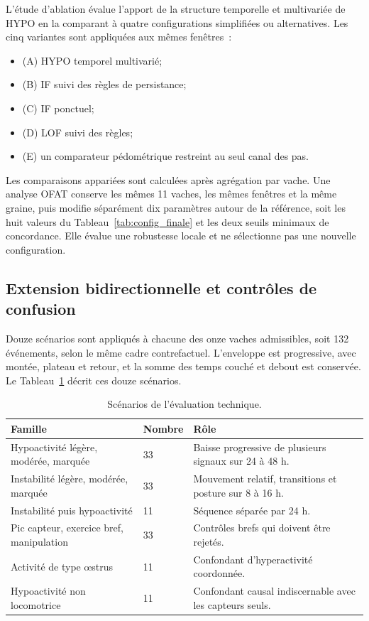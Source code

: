 L'étude d'ablation évalue l'apport de la structure temporelle et multivariée de HYPO en la
comparant à quatre configurations simplifiées ou alternatives. Les cinq variantes sont
appliquées aux mêmes fenêtres~:
\begin{itemize}
  \item (A) HYPO temporel multivarié;
  \item (B) IF suivi des règles de persistance;
  \item (C) IF ponctuel;
  \item (D) LOF suivi des règles;
  \item (E) un comparateur pédométrique restreint au seul canal des pas.
\end{itemize}
Les comparaisons appariées sont calculées après agrégation par vache. Une analyse OFAT
conserve les mêmes 11 vaches, les mêmes fenêtres et la même graine, puis modifie séparément
dix paramètres autour de la référence, soit les huit valeurs du
Tableau~\ref{tab:config_finale} et les deux seuils minimaux de concordance. Elle évalue une robustesse locale et ne sélectionne
pas une nouvelle configuration.

\subsection{Extension bidirectionnelle et contrôles de confusion}
Douze scénarios sont appliqués à chacune des onze vaches admissibles, soit 132 événements,
selon le même cadre contrefactuel. L'enveloppe est progressive, avec montée, plateau et
retour, et la somme des temps couché et debout est conservée. Le
Tableau~\ref{tab:profils_detection} décrit ces douze scénarios.

\begin{table}[H]
  \centering
  \caption{Scénarios de l'évaluation technique.}
  \label{tab:profils_detection}
  \small
  \begin{tabular}{p{}p{}p{}}
    \toprule
    Famille & Nombre & Rôle \\
    \midrule
    Hypoactivité légère, modérée, marquée & 33 & Baisse progressive de plusieurs signaux sur 24 à 48 h. \\
    Instabilité légère, modérée, marquée & 33 & Mouvement relatif, transitions et posture sur 8 à 16 h. \\
    Instabilité puis hypoactivité & 11 & Séquence séparée par 24 h. \\
    Pic capteur, exercice bref, manipulation & 33 & Contrôles brefs qui doivent être rejetés. \\
    Activité de type œstrus & 11 & Confondant d'hyperactivité coordonnée. \\
    Hypoactivité non locomotrice & 11 & Confondant causal indiscernable avec les capteurs seuls. \\
    \bottomrule
  \end{tabular}
\end{table}

